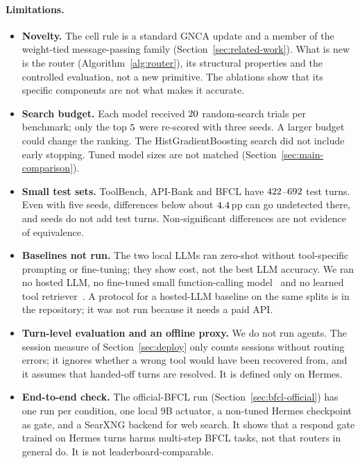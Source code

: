 \documentclass[10pt]{article}
\begin{document}
\paragraph{Limitations.}
\begin{itemize}[leftmargin=1.2em, itemsep=0.1em]
  \item \textbf{Novelty.} The cell rule is a standard GNCA update and a member of the weight-tied message-passing family (Section~\ref{sec:related-work}). What is new is the router (Algorithm~\ref{alg:router}), its structural properties and the controlled evaluation, not a new primitive. The ablations show that its specific components are not what makes it accurate.
  \item \textbf{Search budget.} Each model received $20$ random-search trials per benchmark; only the top $5$ were re-scored with three seeds. A larger budget could change the ranking. The HistGradientBoosting search did not include early stopping. Tuned model sizes are not matched (Section~\ref{sec:main-comparison}).
  \item \textbf{Small test sets.} ToolBench, API-Bank and BFCL have $422$--$692$ test turns. Even with five seeds, differences below about $4.4$\,pp can go undetected there, and seeds do not add test turns. Non-significant differences are not evidence of equivalence.
  \item \textbf{Baselines not run.} The two local LLMs ran zero-shot without tool-specific prompting or fine-tuning; they show cost, not the best LLM accuracy. We ran no hosted LLM, no fine-tuned small function-calling model~\citep{chen2024octopus,erdogan2024tinyagent,lin2024hammer} and no learned tool retriever~\citep{qu2024colt}. A protocol for a hosted-LLM baseline on the same splits is in the repository; it was not run because it needs a paid API.
  \item \textbf{Turn-level evaluation and an offline proxy.} We do not run agents. The session measure of Section~\ref{sec:deploy} only counts sessions without routing errors; it ignores whether a wrong tool would have been recovered from, and it assumes that handed-off turns are resolved. It is defined only on Hermes.
  \item \textbf{End-to-end check.} The official-BFCL run (Section~\ref{sec:bfcl-official}) has one run per condition, one local 9B actuator, a non-tuned Hermes checkpoint as gate, and a SearXNG backend for web search. It shows that a respond gate trained on Hermes turns harms multi-step BFCL tasks, not that routers in general do. It is not leaderboard-comparable.

\end{itemize}
\end{document}
